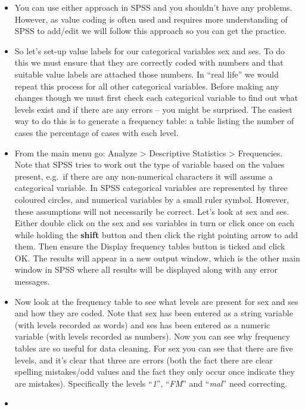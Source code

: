 \documentclass[
]{book}
\begin{document}
\begin{itemize}
\item
  You can use either approach in SPSS and you shouldn't have any problems. However, as value coding is often used and requires more understanding of SPSS to add/edit we will follow this approach so you can get the practice.
\item
  So let's set-up value labels for our categorical variables sex and ses. To do this we must ensure that they are correctly coded with numbers and that suitable value labels are attached those numbers. In ``real life'' we would repeat this process for all other categorical variables. Before making any changes though we must first check each categorical variable to find out what levels exist and if there are any errors -- you might be surprised. The easiest way to do this is to generate a frequency table: a table listing the number of cases the percentage of cases with each level.
\item
  From the main menu go: Analyze \textgreater{} Descriptive Statistics \textgreater{} Frequencies. Note that SPSS tries to work out the type of variable based on the values present, e.g.~if there are any non-numerical characters it will assume a categorical variable. In SPSS categorical variables are represented by three coloured circles, and numerical variables by a small ruler symbol. However, these assumptions will not necessarily be correct. Let's look at sex and ses. Either double click on the sex and ses variables in turn or click once on each while holding the \textbf{shift} button and then click the right pointing arrow to add them. Then ensure the Display frequency tables button is ticked and click OK. The results will appear in a new output window, which is the other main window in SPSS where all results will be displayed along with any error messages.
\item
  Now look at the frequency table to see what levels are present for sex and ses and how they are coded. Note that sex has been entered as a string variable (with levels recorded as words) and ses has been entered as a numeric variable (with levels recorded as numbers). Now you can see why frequency tables are so useful for data cleaning. For sex you can see that there are five levels, and it's clear that three are errors (both the fact there are clear spelling mistakes/odd values and the fact they only occur once indicate they are mistakes). Specifically the levels ``\emph{1}'', ``\emph{FM}'' and ``\emph{mal}'' need correcting.
\item

\end{itemize}
\end{document}
